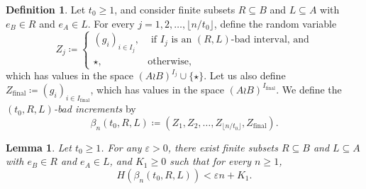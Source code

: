 \documentclass[reqno,oneside,11pt]{amsart}
\theoremstyle{plain}
\newtheorem{lem}[thm]{Lemma}
\theoremstyle{definition}
\newtheorem{defn}[thm]{Definition} %
\begin{document}
\begin{defn}\label{defn: define the partition of bad and final intervals.}
	Let $t_0\ge 1$, and consider finite subsets $R\subseteq B$ and $L\subseteq A$ with $e_B\in R$ and $e_A\in L$.
	For every $j=1,2,\ldots,\lfloor n/t_0 \rfloor$, define the random variable
	\begin{equation*}
		Z_j\coloneqq\begin{cases}
			(g_i)_{i\in I_j}, &\text{ if }I_j \text{ is an }(R,L)\text{-bad interval, and}\\
			\star, &\text{otherwise,}
		\end{cases}
	\end{equation*}
	which has values in the space $(A\wr B)^{I_j}\cup \{\star\}$.
	Let us also define $Z_{\mathrm{final}}\coloneqq (g_i)_{i\in I_{\mathrm{final}}}$, which has values in the space $(A\wr B)^{I_{\mathrm{final}}}$. We define the \emph{$(t_0,R,L)$-bad increments} by
	\begin{equation*}
		\beta_n(t_0,R,L)\coloneqq (Z_{1},Z_{2},\ldots,Z_{\lfloor n/t_0 \rfloor},Z_{\mathrm{final}}).
	\end{equation*}
	
\end{defn}
\begin{lem}\label{lem: bad increments have small entropy} Let $t_0\ge 1$. For any $\varepsilon>0$, there exist finite subsets $R\subseteq B$ and $L\subseteq A$ with $e_B\in R$ and $e_A\in L$, and $K_1\ge 0$ such that for every $n\ge 1$,
	\begin{equation*}\label{eq: bad increments entropy}
		H(\beta_n(t_0,R,L))<\varepsilon n + K_1.
	\end{equation*}
\end{lem}
\end{document}
